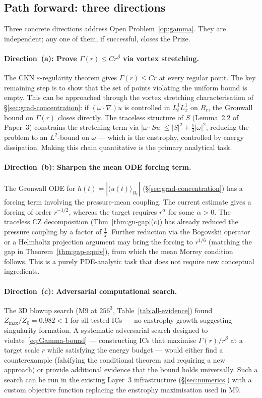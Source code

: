 \documentclass[11pt]{article}
\theoremstyle{definition}
\theoremstyle{remark}
\newcommand{\grad}{\nabla}
\newcommand{\eps}{\varepsilon}
\begin{document}
\subsection{Path forward: three directions}
\label{sec:path-forward}

Three concrete directions address Open Problem~\ref{op:gamma}.  They are
independent; any one of them, if successful, closes the Prize.

\paragraph{Direction~(a): Prove $\Gamma(r)\leq Cr^\beta$ via vortex stretching.}
The CKN $\eps$-regularity theorem gives $\Gamma(r)\leq Cr$ at every
regular point.  The key remaining step is to show that the set of points
violating the uniform bound is empty.  This can be approached through the
vortex stretching characterisation of §\ref{sec:grad-concentration}: if
$(\omega\cdot\grad)u$ is controlled in $L^1_tL^1_x$ on $B_r$, the Gronwall
bound on $\Gamma(r)$ closes directly.  The traceless structure of $S$
(Lemma~2.2 of Paper~3) constrains the stretching term via
$|\omega\cdot Su|\leq|S|^2+\tfrac{1}{4}|\omega|^2$, reducing the problem
to an $L^2$-bound on $\omega$ — which is the enstrophy, controlled by
energy dissipation.  Making this chain quantitative is the primary
analytical task.

\paragraph{Direction~(b): Sharpen the mean ODE forcing term.}
The Gronwall ODE for $h(t)=|\langle u(t)\rangle_{B_r}|$ (§\ref{sec:grad-concentration})
has a forcing term involving the pressure-mean coupling.  The current estimate
gives a forcing of order $r^{-1/2}$, whereas the target requires $r^{\alpha}$
for some $\alpha>0$.  The traceless CZ decomposition (Thm~\ref{thm:gn-gap}(c))
has already reduced the pressure coupling by a factor of $\tfrac{1}{2}$.
Further reduction via the Bogovskii operator or a Helmholtz projection
argument may bring the forcing to $r^{1/6}$ (matching the gap in
Theorem~\ref{thm:gap-equiv}), from which the mean Morrey condition follows.
This is a purely PDE-analytic task that does not require new conceptual
ingredients.

\paragraph{Direction~(c): Adversarial computational search.}
The 3D blowup search (M9 at $256^3$, Table~\ref{tab:all-evidence}) found
$Z_{\max}/Z_0 = 0.982 < 1$ for all tested ICs — no enstrophy growth
suggesting singularity formation.  A systematic adversarial search designed
to violate~\eqref{eq:Gamma-bound} — constructing ICs that maximise
$\Gamma(r)/r^\beta$ at a target scale $r$ while satisfying the energy
budget — would either find a counterexample (falsifying the conditional
theorem and requiring a new approach) or provide additional evidence that
the bound holds universally.  Such a search can be run in the existing Layer~3
infrastructure (§\ref{sec:numerics}) with a custom objective function
replacing the enstrophy maximisation used in M9.
\end{document}
